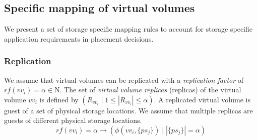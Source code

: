 \documentclass[conference]{IEEEtran}
\begin{document}
\subsection{Specific mapping of virtual volumes}
We present a set of storage specific mapping rules to account for storage specific application requirements in placement decisions. 

\subsubsection{Replication} 
We assume that virtual volumes can be replicated with a \textit{replication factor} of $rf(vv_i) = \alpha \in \mathrm{N}$. The set of \textit{virtual volume replicas} (replicas) of the virtual volume $vv_i$ is defined by $( R_{vv_i} \mid 1 \leq \left\vert R_{vv_i} \right\vert \leq \alpha )$. A replicated virtual volume is guest of a set of physical storage locations. %
We assume that multiple replicas are guests of different physical storage locations. 
\begin{equation}
rf(vv_i) = \alpha \rightarrow ( \phi(vv_i, \{ps_j\}) \mid \left\vert \{ps_j\} \right\vert = \alpha )
\end{equation}

 
\end{document}
